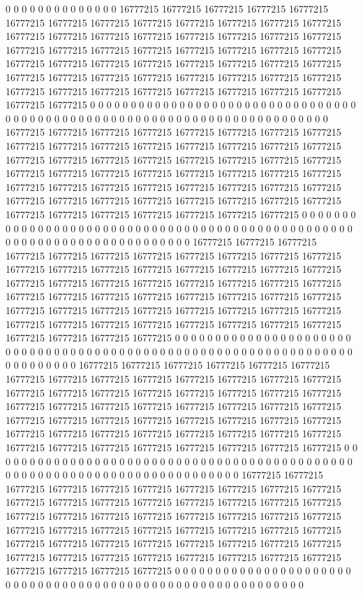 0 0 0 0 0 0 0 0 0 0 0 0 0 0 16777215 16777215 16777215 16777215 16777215 16777215 16777215 16777215 16777215 16777215 16777215 16777215 16777215 16777215 16777215 16777215 16777215 16777215 16777215 16777215 16777215 16777215 16777215 16777215 16777215 16777215 16777215 16777215 16777215 16777215 16777215 16777215 16777215 16777215 16777215 16777215 16777215 16777215 16777215 16777215 16777215 16777215 16777215 16777215 16777215 16777215 16777215 16777215 16777215 16777215 16777215 16777215 16777215 16777215 16777215 0 0 0 0 0 0 0 0 0 0 0 0 0 0 0 0 0 0 0 0 0 0 0 0 0 0 0 0 0 0 0 0 0 0 0 0 0 0 0 0 0 0 0 0 0 0 0 0 0 0 0 0 0 0 0 0 0 0 0
0 0 0 0 0 0 0 0 0 0 0 0 0 0 16777215 16777215 16777215 16777215 16777215 16777215 16777215 16777215 16777215 16777215 16777215 16777215 16777215 16777215 16777215 16777215 16777215 16777215 16777215 16777215 16777215 16777215 16777215 16777215 16777215 16777215 16777215 16777215 16777215 16777215 16777215 16777215 16777215 16777215 16777215 16777215 16777215 16777215 16777215 16777215 16777215 16777215 16777215 16777215 16777215 16777215 16777215 16777215 16777215 16777215 16777215 16777215 16777215 16777215 16777215 0 0 0 0 0 0 0 0 0 0 0 0 0 0 0 0 0 0 0 0 0 0 0 0 0 0 0 0 0 0 0 0 0 0 0 0 0 0 0 0 0 0 0 0 0 0 0 0 0 0 0 0 0 0 0 0 0 0 0
0 0 0 0 0 0 0 0 0 0 0 0 0 0 16777215 16777215 16777215 16777215 16777215 16777215 16777215 16777215 16777215 16777215 16777215 16777215 16777215 16777215 16777215 16777215 16777215 16777215 16777215 16777215 16777215 16777215 16777215 16777215 16777215 16777215 16777215 16777215 16777215 16777215 16777215 16777215 16777215 16777215 16777215 16777215 16777215 16777215 16777215 16777215 16777215 16777215 16777215 16777215 16777215 16777215 16777215 16777215 16777215 16777215 16777215 16777215 16777215 16777215 16777215 0 0 0 0 0 0 0 0 0 0 0 0 0 0 0 0 0 0 0 0 0 0 0 0 0 0 0 0 0 0 0 0 0 0 0 0 0 0 0 0 0 0 0 0 0 0 0 0 0 0 0 0 0 0 0 0 0 0 0
0 0 0 0 0 0 0 0 0 0 0 0 0 0 0 16777215 16777215 16777215 16777215 16777215 16777215 16777215 16777215 16777215 16777215 16777215 16777215 16777215 16777215 16777215 16777215 16777215 16777215 16777215 16777215 16777215 16777215 16777215 16777215 16777215 16777215 16777215 16777215 16777215 16777215 16777215 16777215 16777215 16777215 16777215 16777215 16777215 16777215 16777215 16777215 16777215 16777215 16777215 16777215 16777215 16777215 16777215 16777215 16777215 16777215 16777215 16777215 16777215 16777215 0 0 0 0 0 0 0 0 0 0 0 0 0 0 0 0 0 0 0 0 0 0 0 0 0 0 0 0 0 0 0 0 0 0 0 0 0 0 0 0 0 0 0 0 0 0 0 0 0 0 0 0 0 0 0 0 0 0 0
0 0 0 0 0 0 0 0 0 0 0 0 0 0 0 16777215 16777215 16777215 16777215 16777215 16777215 16777215 16777215 16777215 16777215 16777215 16777215 16777215 16777215 16777215 16777215 16777215 16777215 16777215 16777215 16777215 16777215 16777215 16777215 16777215 16777215 16777215 16777215 16777215 16777215 16777215 16777215 16777215 16777215 16777215 16777215 16777215 16777215 16777215 16777215 16777215 16777215 16777215 16777215 16777215 16777215 16777215 16777215 16777215 16777215 16777215 16777215 16777215 16777215 0 0 0 0 0 0 0 0 0 0 0 0 0 0 0 0 0 0 0 0 0 0 0 0 0 0 0 0 0 0 0 0 0 0 0 0 0 0 0 0 0 0 0 0 0 0 0 0 0 0 0 0 0 0 0 0 0 0 0
